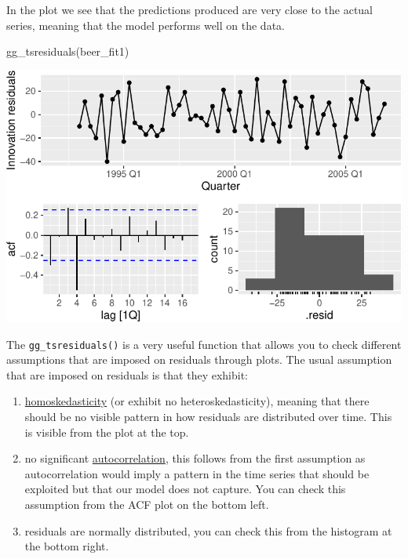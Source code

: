 \documentclass[
  letterpaper,
  DIV=11,
  numbers=noendperiod]{scrartcl}
\newenvironment{Shaded}{\begin{snugshade}}{\end{snugshade}}
\newcommand{\FunctionTok}[1]{\textcolor[rgb]{0.28,0.35,0.67}{#1}}
\newcommand{\NormalTok}[1]{\textcolor[rgb]{0.00,0.23,0.31}{#1}}
\providecommand{\tightlist}{%
  \setlength{\itemsep}{0pt}\setlength{\parskip}{0pt}}\usepackage{longtable,booktabs,array}
\begin{document}
In the plot we see that the predictions produced are very close to the
actual series, meaning that the model performs well on the data.

\begin{Shaded}
\begin{Highlighting}[]
\FunctionTok{gg\_tsresiduals}\NormalTok{(beer\_fit1)}
\end{Highlighting}
\end{Shaded}

\begin{center}
\includegraphics{chapter5_review_files/figure-pdf/unnamed-chunk-28-1.pdf}
\end{center}

The \texttt{gg\_tsresiduals()} is a very useful function that allows you
to check different assumptions that are imposed on residuals through
plots. The usual assumption that are imposed on residuals is that they
exhibit:

\begin{enumerate}
\def\labelenumi{\arabic{enumi}.}
\tightlist
\item
  \href{https://en.wikipedia.org/wiki/Homoscedasticity_and_heteroscedasticity}{homoskedasticity}
  (or exhibit no heteroskedasticity), meaning that there should be no
  visible pattern in how residuals are distributed over time. This is
  visible from the plot at the top.
\item
  no significant
  \href{https://en.wikipedia.org/wiki/Autocorrelation}{autocorrelation},
  this follows from the first assumption as autocorrelation would imply
  a pattern in the time series that should be exploited but that our
  model does not capture. You can check this assumption from the ACF
  plot on the bottom left.
\item
  residuals are normally distributed, you can check this from the
  histogram at the bottom right.
\end{enumerate}
\end{document}
